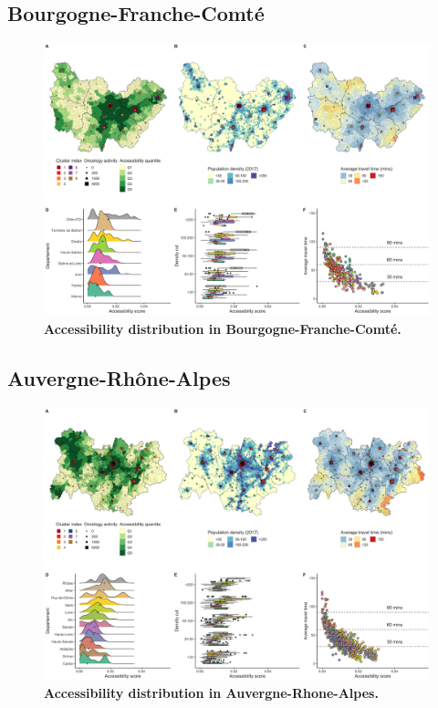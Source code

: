 \subsection*{Bourgogne-Franche-Comté}

\begin{figure}[H]
    \includegraphics[width=\textwidth]{images/camion/region_accessibility/accessibility_Bourgogne-Franche-Comte.png}
    \centering
    \caption{
        \textbf{Accessibility distribution in Bourgogne-Franche-Comté.}
    }
\end{figure}

\subsection*{Auvergne-Rhône-Alpes}

\begin{figure}[H]
    \includegraphics[width=\textwidth]{images/camion/region_accessibility/accessibility_Auvergne-Rhone-Alpes.png}
    \centering
    \caption{
        \textbf{Accessibility distribution in Auvergne-Rhone-Alpes.}
    }
\end{figure}

